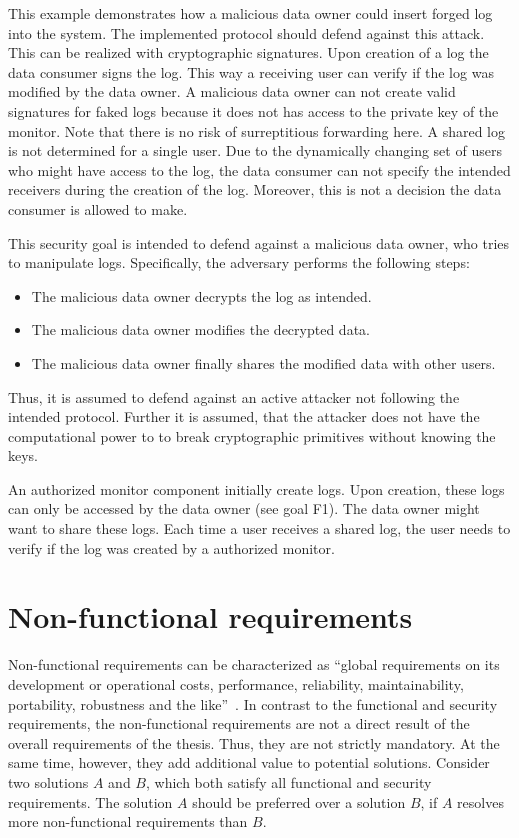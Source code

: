\documentclass[../main.tex]{subfiles}
\begin{document}
This example demonstrates how a malicious data owner could insert forged log into the system.
The implemented protocol should defend against this attack.
This can be realized with cryptographic signatures.
Upon creation of a log the data consumer signs the log.
This way a receiving user can verify if the log was modified by the data owner.
A malicious data owner can not create valid signatures for faked logs because it does not has access to the private key of the monitor.
Note that there is no risk of surreptitious forwarding here.
A shared log is not determined for a single user. 
Due to the dynamically changing set of users who might have access to the log, the data consumer can not specify the intended receivers during the creation of the log.
Moreover, this is not a decision the data consumer is allowed to make.


This security goal is intended to defend against a malicious data owner, who tries to manipulate logs. 
Specifically, the adversary performs the following steps:
\begin{itemize}
    \item The malicious data owner decrypts the log as intended.
    \item The malicious data owner modifies the decrypted data.
    \item The malicious data owner finally shares the modified data with other users.
\end{itemize}
Thus, it is assumed to defend against an active attacker not following the intended protocol.
Further it is assumed, that the attacker does not have the computational power to to break cryptographic primitives without knowing the keys.

An authorized monitor component initially create logs. 
Upon creation, these logs can only be accessed by the data owner (see goal F1).
The data owner might want to share these logs.
Each time a user receives a shared log, the user needs to verify if the log was created by a authorized monitor.

\section{Non-functional requirements}\label{non-functional-requriements}
Non-functional requirements can be characterized as \enquote{global requirements on its development or operational costs, performance, reliability, maintainability, portability, robustness and the like}~\cite[11]{Mylopoulos1992}.
In contrast to the functional and security requirements, the non-functional requirements are not a direct result of the overall requirements of the thesis.
Thus, they are not strictly mandatory.
At the same time, however, they add additional value to potential solutions.
Consider two solutions $A$ and $B$, which both satisfy all functional and security requirements.
The solution $A$ should be preferred over a solution $B$, if $A$ resolves more non-functional requirements than $B$.
\end{document}
